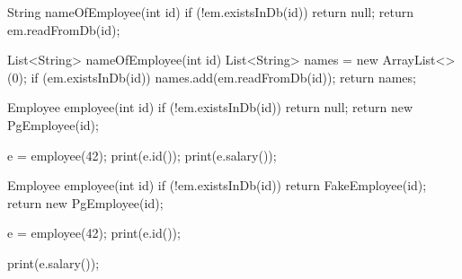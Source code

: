\documentclass{article}
\begin{document}
\begin{lnSnippet}
String nameOfEmployee(int id) {
  if (!em.existsInDb(id)) {
    return null;
  }
  return em.readFromDb(id);
}
\end{lnSnippet}
\begin{lnSnippet}
List<String> nameOfEmployee(int id) {
  List<String> names =
    new ArrayList<>(0);
  if (em.existsInDb(id)) {
    names.add(em.readFromDb(id));
  }
  return names;
}
\end{lnSnippet}


\begin{lnSnippet}
Employee employee(int id) {
  if (!em.existsInDb(id)) {
    return null;
  }
  return new PgEmployee(id);
}

e = employee(42);
print(e.id());
print(e.salary());
\end{lnSnippet}
\begin{lnSnippet}
Employee employee(int id) {
  if (!em.existsInDb(id)) {
    return FakeEmployee(id);
  }
  return new PgEmployee(id);
}

e = employee(42);
print(e.id());

print(e.salary());
\end{lnSnippet}

\end{document}
